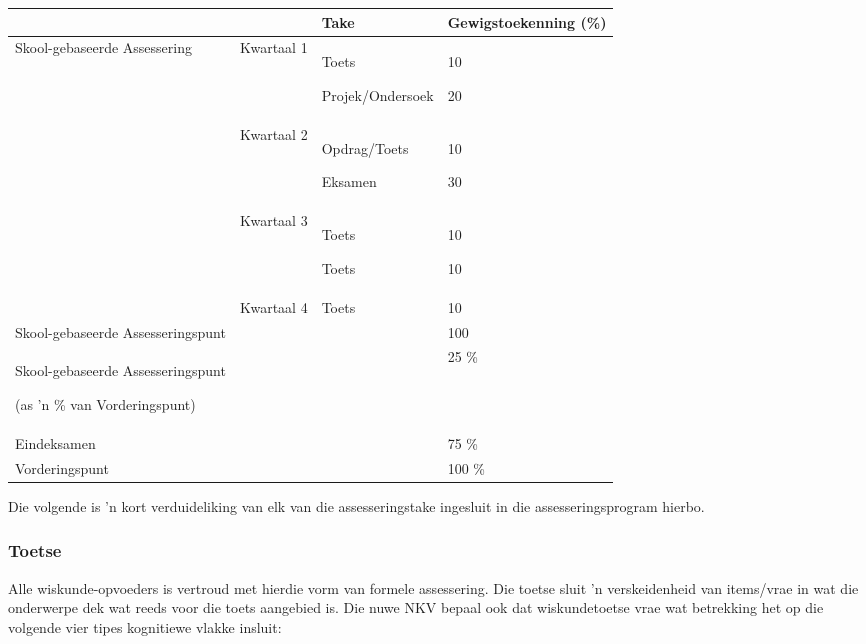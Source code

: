 \begin{table}[H]
\begin{center}
\begin{tabular} {|p{5cm}|p{1.5cm}|p{2.5cm}|p{2.8cm}|} \hline
	  & 			& \textbf{Take} 			& \textbf{Gewigstoekenning (\%)} \\ \hline
Skool-gebaseerde Assessering &
Kwartaal 1 &
Toets \par Projek/Ondersoek &
10 \par 20 \\ \hline
&
Kwartaal 2 &
Opdrag/Toets \par Eksamen &
10 \par 30 \\ \hline
&
Kwartaal 3 &
Toets \par Toets &
10 \par 10 \\ \hline
&
Kwartaal 4 & Toets &
10 \\ \hline
Skool-gebaseerde Assesseringspunt &
&
&
100 \\ \hline
Skool-gebaseerde Assesseringspunt  \par
(as 'n \% van Vorderingspunt)
			&	 & 					&  25 \% \\ \hline

Eindeksamen & 	& 					&75 \% \\ \hline
Vorderingspunt 		&       & 					& 100 \% \\ \hline


\end{tabular}
 \end{center}
\end{table}

Die volgende is 'n kort verduideliking van elk van die
assesseringstake ingesluit in die assesseringsprogram hierbo.

\subsubsection{Toetse}
Alle wiskunde-opvoeders is vertroud met hierdie vorm van formele
assessering. Die toetse sluit 'n verskeidenheid van items/vrae in wat
die onderwerpe dek wat reeds voor die toets aangebied is. Die nuwe NKV
bepaal ook dat wiskundetoetse vrae wat betrekking het op die volgende
vier tipes kognitiewe vlakke insluit:

